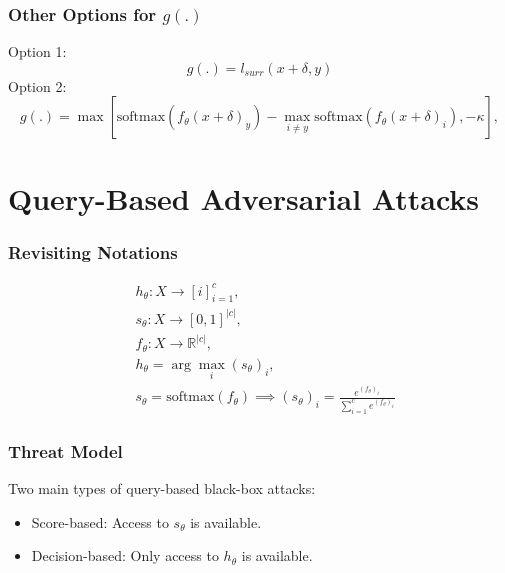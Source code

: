 \documentclass[11pt]{report}
\begin{document}
\subsubsection*{Other Options for $g(.)$}
Option 1:
\[
    g(.) = l_{surr}(x+\delta, y)
\]
Option 2:
\[
    g(.) = \max[\text{softmax}(f_\theta(x+\delta)_y) - \max_{i \neq y} \text{softmax}(f_\theta(x+\delta)_i), -\kappa],
\]

\section{Query-Based Adversarial Attacks}

\subsubsection*{Revisiting Notations}

\[
\begin{aligned}
    & h_\theta : X \xrightarrow{} [i]_{i=1}^c, \\
    & s_\theta : X \xrightarrow{} [0,1]^{\lvert c \rvert}, \\
    & f_\theta: X \xrightarrow{} \mathbb{R}^{\lvert c \rvert}, \\
    & h_\theta = \arg\max_i (s_\theta)_i, \\
    & s_\theta = \text{softmax}(f_\theta) \implies (s_\theta)_i = \frac{e^{(f_\theta)_i}}{\sum_{i=1}^c e^{(f_\theta)_i}}
\end{aligned}
\]

\subsubsection*{Threat Model}
Two main types of query-based black-box attacks:
\begin{itemize}
    \item Score-based: Access to $s_\theta$ is available.
    \item Decision-based: Only access to $h_\theta$ is available.
\end{itemize}
\end{document}
